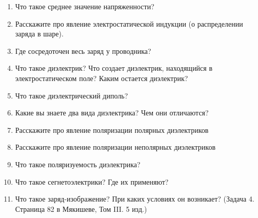 \documentclass[12pt,a4paper]{report}
\begin{document}
\begin{enumerate}
\item Что такое среднее значение напряженности?
\item Расскажите про явление электростатической индукции (о распределении заряда в шаре).
\item Где сосредоточен весь заряд у проводника?
\item Что такое диэлектрик? Что создает диэлектрик, находящийся в электростатическом поле? Каким остается диэлектрик?
\item Что такое диэлектрический диполь?
\item Какие вы знаете два вида диэлектрика? Чем они отличаются?
\item Расскажите про явление поляризации полярных диэлектриков
\item Расскажите про явление поляризации неполярных диэлектриков
\item Что такое поляризуемость диэлектрика?
\item Что такое сегнетоэлектрики? Где их применяют?
\item Что такое заряд-изображение? При каких условиях он возникает? (Задача 4. Страница 82 в Мякишеве, Том III. 5 изд.)
\end{enumerate}
\end{document}
